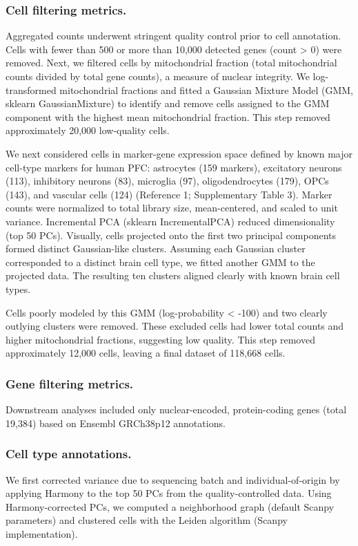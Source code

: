 \subsubsection{Cell filtering metrics.}
Aggregated counts underwent stringent quality control prior to cell annotation. Cells with fewer than 500 or more than 10,000 detected genes (count > 0) were removed. Next, we filtered cells by mitochondrial fraction (total mitochondrial counts divided by total gene counts), a measure of nuclear integrity. We log-transformed mitochondrial fractions and fitted a Gaussian Mixture Model (GMM, sklearn GaussianMixture) to identify and remove cells assigned to the GMM component with the highest mean mitochondrial fraction. This step removed approximately 20,000 low-quality cells.

We next considered cells in marker-gene expression space defined by known major cell-type markers for human PFC: astrocytes (159 markers), excitatory neurons (113), inhibitory neurons (83), microglia (97), oligodendrocytes (179), OPCs (143), and vascular cells (124) (Reference 1; Supplementary Table 3). Marker counts were normalized to total library size, mean-centered, and scaled to unit variance. Incremental PCA (sklearn IncrementalPCA) reduced dimensionality (top 50 PCs). Visually, cells projected onto the first two principal components formed distinct Gaussian-like clusters. Assuming each Gaussian cluster corresponded to a distinct brain cell type, we fitted another GMM to the projected data. The resulting ten clusters aligned clearly with known brain cell types.

Cells poorly modeled by this GMM (log-probability < -100) and two clearly outlying clusters were removed. These excluded cells had lower total counts and higher mitochondrial fractions, suggesting low quality. This step removed approximately 12,000 cells, leaving a final dataset of 118,668 cells.

\subsubsection{Gene filtering metrics.}
Downstream analyses included only nuclear-encoded, protein-coding genes (total 19,384) based on Ensembl GRCh38p12 annotations.

\subsubsection{Cell type annotations.}
We first corrected variance due to sequencing batch and individual-of-origin by applying Harmony\supercite{Korsunsky2019-qz} to the top 50 PCs from the quality-controlled data. Using Harmony-corrected PCs, we computed a neighborhood graph (default Scanpy parameters)\supercite{Wolf2018-jx} and clustered cells with the Leiden algorithm (Scanpy implementation)\supercite{Traag2019-xu}.

